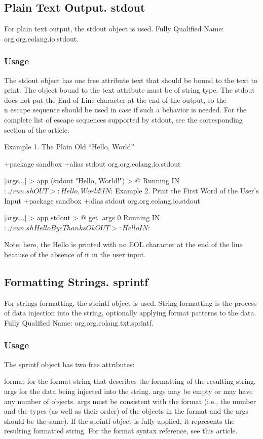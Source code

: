 \documentclass[12pt]{book}
\begin{document}
\subsection{Plain Text Output. stdout}
For plain text output, the stdout object is used.
Fully Qualified Name: org.org.eolang.io.stdout.

\subsubsection{Usage}
The stdout object has one free attribute text that should be bound to the text to print.
The object bound to the text attribute must be of string type.
The stdout does not put the End of Line character at the end of the output, so the \\n escape sequence should be used in case if such a behavior is needed.
For the complete list of escape sequences supported by stdout, see the corresponding section of the article.

Example 1. The Plain Old “Hello, World”
\begin{ffcode}
+package sandbox
+alias stdout org.org.eolang.io.stdout

[args...] > app
  (stdout "Hello, World!\n") > @
Running
IN$: ./run.sh
OUT>: Hello, World!
IN$: 
Example 2. Print the First Word of the User's Input
+package sandbox
+alias stdout org.org.eolang.io.stdout

[args...] > app
  stdout > @
    get.
      args
      0
Running
IN$: ./run.sh Hello Bye Thanks Ok
OUT>: HelloIN$: 
\end{ffcode}

Note: here, the Hello is printed with no EOL character at the end of the line because of the absence of it in the user input.

\subsection{Formatting Strings. sprintf}
For strings formatting, the sprintf object is used.
String formatting is the process of data injection into the string, optionally applying format patterns to the data.
Fully Qualified Name: org.org.eolang.txt.sprintf.

\subsubsection{Usage}
The sprintf object has two free attributes:

format for the format string that describes the formatting of the resulting string.
args for the data being injected into the string. args may be empty or may have any number of objects. args must be consistent with the format (i.e., the number and the types (as well as their order) of the objects in the format and the args should be the same).
If the sprintf object is fully applied, it represents the resulting formatted string.
For the format syntax reference, see this article.
\end{document}
